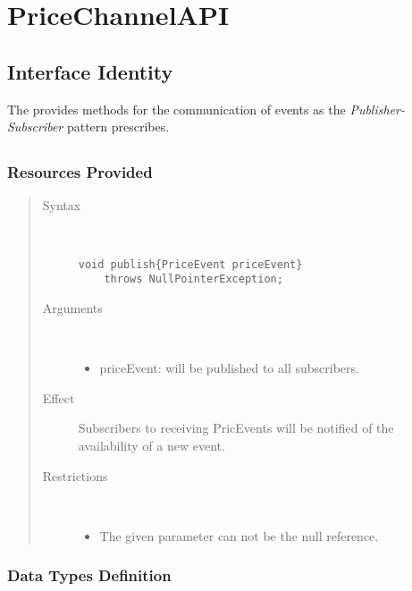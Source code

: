 \section{PriceChannelAPI}
\label{api:other-price-channel-api}

\subsection{Interface Identity}

\npar The  provides methods for the communication of
events as the \emph{Publisher-Subscriber} pattern prescribes.

\subsection{}

\subsubsection{Resources Provided}

\begin{quote}
	\begin{description}
		\item[Syntax] \
		\begin{verbatim}
void publish{PriceEvent priceEvent}
    throws NullPointerException;
		\end{verbatim}
		\item[Arguments] \
		\begin{itemize}
		  \item priceEvent: will be published to all subscribers.
		\end{itemize}
		\item[Effect] Subscribers to receiving PricEvents will be notified of
		the availability of a new event. 
		\item[Restrictions] \
		\begin{itemize}
		  \item The given parameter can not be the null reference.
		\end{itemize}
	\end{description}
\end{quote}

\subsubsection{Data Types Definition}

